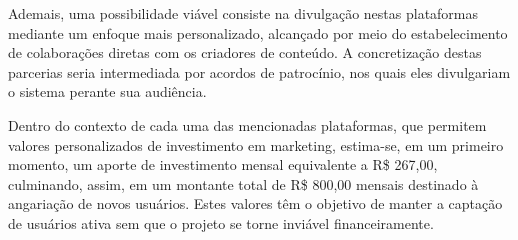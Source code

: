 Ademais, uma possibilidade viável consiste na divulgação nestas plataformas mediante um enfoque mais personalizado, alcançado por meio do estabelecimento de colaborações diretas com os criadores de conteúdo. A concretização destas parcerias seria intermediada por acordos de patrocínio, nos quais eles divulgariam o sistema perante sua audiência.

Dentro do contexto de cada uma das mencionadas plataformas, que permitem valores personalizados de investimento em marketing, estima-se, em um primeiro momento, um aporte de investimento mensal equivalente a R\$ 267,00, culminando, assim, em um montante total de R\$ 800,00 mensais destinado à angariação de novos usuários. Estes valores têm o objetivo de manter a captação de usuários ativa sem que o projeto se torne inviável financeiramente.